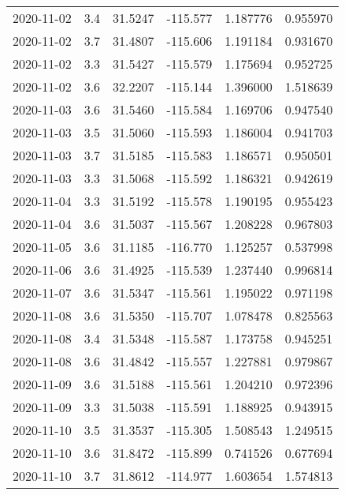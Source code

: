 \begin{tabular}{lrrrrr}
2020-11-02 &       3.4 &  31.5247 &  -115.577 &         1.187776 &         0.955970 \\
2020-11-02 &       3.7 &  31.4807 &  -115.606 &         1.191184 &         0.931670 \\
2020-11-02 &       3.3 &  31.5427 &  -115.579 &         1.175694 &         0.952725 \\
2020-11-02 &       3.6 &  32.2207 &  -115.144 &         1.396000 &         1.518639 \\
2020-11-03 &       3.6 &  31.5460 &  -115.584 &         1.169706 &         0.947540 \\
2020-11-03 &       3.5 &  31.5060 &  -115.593 &         1.186004 &         0.941703 \\
2020-11-03 &       3.7 &  31.5185 &  -115.583 &         1.186571 &         0.950501 \\
2020-11-03 &       3.3 &  31.5068 &  -115.592 &         1.186321 &         0.942619 \\
2020-11-04 &       3.3 &  31.5192 &  -115.578 &         1.190195 &         0.955423 \\
2020-11-04 &       3.6 &  31.5037 &  -115.567 &         1.208228 &         0.967803 \\
2020-11-05 &       3.6 &  31.1185 &  -116.770 &         1.125257 &         0.537998 \\
2020-11-06 &       3.6 &  31.4925 &  -115.539 &         1.237440 &         0.996814 \\
2020-11-07 &       3.6 &  31.5347 &  -115.561 &         1.195022 &         0.971198 \\
2020-11-08 &       3.6 &  31.5350 &  -115.707 &         1.078478 &         0.825563 \\
2020-11-08 &       3.4 &  31.5348 &  -115.587 &         1.173758 &         0.945251 \\
2020-11-08 &       3.6 &  31.4842 &  -115.557 &         1.227881 &         0.979867 \\
2020-11-09 &       3.6 &  31.5188 &  -115.561 &         1.204210 &         0.972396 \\
2020-11-09 &       3.3 &  31.5038 &  -115.591 &         1.188925 &         0.943915 \\
2020-11-10 &       3.5 &  31.3537 &  -115.305 &         1.508543 &         1.249515 \\
2020-11-10 &       3.6 &  31.8472 &  -115.899 &         0.741526 &         0.677694 \\
2020-11-10 &       3.7 &  31.8612 &  -114.977 &         1.603654 &         1.574813 \\

\end{tabular}
